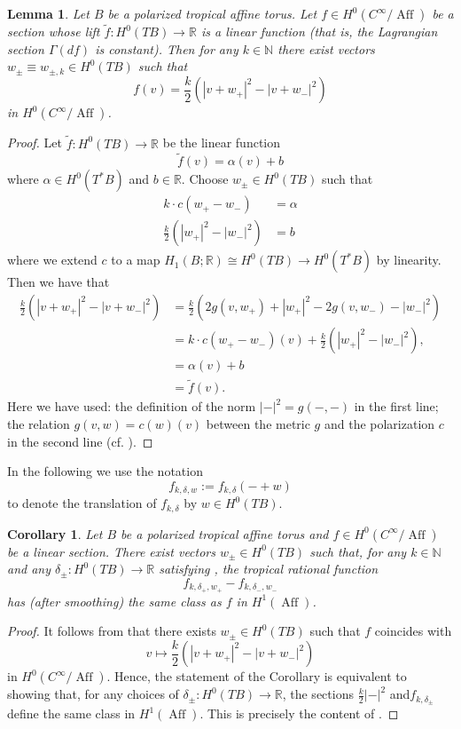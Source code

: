 \documentclass[10pt]{amsart}
\newtheorem{lem}[thm]{Lemma}
\newtheorem{cor}[thm]{Corollary}
\theoremstyle{definition}
\theoremstyle{remark}
\def\N{\mathbb{N}}
\def\R{\mathbb{R}}
\DeclareMathOperator{\Aff}{Aff}
\begin{document}
\begin{lem}\label{lem:linearfunctionasnorm}
    Let $B$ be a polarized tropical affine torus.
    Let $f \in H^0(C^\infty / \Aff)$ be a section whose lift $\tilde f : H^0(TB) \to \R$ is a linear function (that is, the Lagrangian section $\Gamma(df)$ is constant).
    Then for any $k \in \N$ there exist vectors $w_\pm \equiv w_{\pm,k} \in H^0(TB)$ such that 
    $$
        f(v) = \frac{k}{2}\left(|v + w_+|^2 - |v + w_-|^2\right)
    $$
    in $H^0(C^\infty / \Aff)$.
\end{lem}
\begin{proof}
    Let $\tilde f : H^0(TB) \to \R$ be the linear function
    $$
        \tilde f(v) = \alpha(v) + b
    $$
    where $\alpha \in H^0(T^* B)$ and $b \in \R$.
    Choose $w_\pm \in H^0(TB)$ such that 
    \begin{align*}
        k\cdot c(w_+ - w_-) &= \alpha \\
        \frac{k}{2}\left(|w_+|^2 - |w_-|^2\right) &= b
    \end{align*}
    where we extend $c$ to a map $H_1(B;\R) \cong H^0(TB) \to H^0(T^*B)$ by linearity.
    Then we  have that
    \begin{align*}
        \frac{k}{2}\left(|v + w_+|^2 - |v + w_-|^2\right) & =  \frac{k}{2}\left(2g(v,w_+) + |w_+|^2 - 2g(v,w_-) - |w_-|^2\right)\\
        &= k\cdot c(w_+-w_-)(v) + \frac{k}{2}\left(|w_+|^2 - |w_-|^2\right),\\
        &=\alpha(v) + b \\
        &= \tilde f(v).
    \end{align*}
    Here we have used: the definition of the norm $|-|^2 = g(-,-)$ in the first line; the relation $g(v,w) = c(w)(v)$ between the metric $g$ and the polarization $c$ in the second line (cf. ).
\end{proof}

In the following we use the notation
$$
f_{k,\delta, w} := f_{k,\delta}(- + w)
$$
to denote the translation of  $f_{k,\delta}$ by $w \in H^0(TB)$.

\begin{cor}\label{cor:linearfunctionastropical}
    Let $B$ be a polarized tropical affine torus and $f \in H^0(C^\infty / \Aff)$ be a linear section.
    There exist vectors $w_\pm \in H^0(TB)$ such that, for any $k \in \N$ and any $\delta_\pm:H^0(TB) \to \R$ satisfying , the tropical rational function
    $$
        f_{k,\delta_+,w_+} - f_{k,\delta_-,w_-}
    $$
    has (after smoothing) the same class as $f$ in $H^1(\Aff)$.
\end{cor}
\begin{proof}
    It follows from  that there exists $w_\pm \in H^0(TB)$ such that  $f$ coincides with 
    $$
        v\mapsto \frac{k}{2}\left(|v + w_+|^2 - |v + w_-|^2\right)
    $$
    in $H^0(C^\infty/\Aff)$.
    Hence, the statement of the Corollary is equivalent to showing that, for any choices of $\delta_\pm:H^0(TB) \to \R$, the sections $\frac{k}{2}|-|^2$ and$f_{k,\delta_\pm}$ define the same class in $H^1(\Aff)$.
    This is precisely the content of .
\end{proof}
\end{document}

